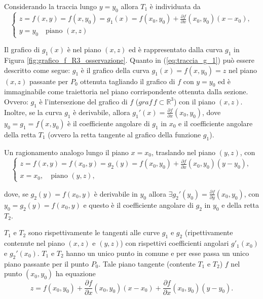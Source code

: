 Considerando la traccia lungo $y=y_0$ allora $T_1$ è individuata da
\begin{equation}\label{eq:traccia_g_1}
    \begin{cases}
        z=f(x,y)=f(x,y_0)=g_1(x) = f(x_0,y_0) + \frac{\partial f}{\partial x} (x_0,y_0) (x-x_0),\\
        y=y_0\quad \text{piano }(x,z)
    \end{cases}
\end{equation}

Il grafico di $g_1(x)$ è nel piano $(x,z)$ ed è rappresentato dalla curva $g_1$ in Figura \ref{fig:grafico_f_R3_osservazione}. Quanto in (\ref{eq:traccia_g_1}) può essere descritto come segue: $g_1$ è il grafico della curva $g_1(x)=f(x,y_0)=z$ nel piano $(x,z)$ passante per $P_0$ ottenuta tagliando il grafico di $f$ con $y=y_0$ ed è immaginabile come traiettoria nel piano corrispondente ottenuta dalla sezione. Ovvero: $g_1$ è l'intersezione del grafico di $f$ ($graf\, f\subset\mathbb R^3$) con il piano $(x,z)$. Inoltre, se la curva $g_1$ è derivabile, allora $g_1'(x)=\frac{\partial f}{\partial x}(x_0,y_0)$, dove $y_0=g_1=f(x,y_0)$ è il coefficiente angolare di $g_1$ in $x_0$ e il coefficiente angolare della retta $T_1$ (ovvero la retta tangente al grafico della funzione $g_1$).

Un ragionamento analogo lungo il piano $x=x_0$, traslando nel piano $(y,z)$, con
\begin{equation}\label{eq:traccia_g_2}
	\begin{cases}
		z=f(x,y)=f(x_0,y)=g_2(y) = f(x_0,y_0) + \frac{\partial f}{\partial x} (x_0,y_0) (y-y_0),\\
		x=x_0,\quad \text{piano } (y,z),
	\end{cases}
\end{equation}

dove, se $g_2(y)=f(x_0,y)$ è derivabile in $y_0$ allora $\exists g_2'(y_0)=\frac{\partial f}{\partial y}(x_0,y_0)$, con $y_0=g_2(y)=f(x_0,y)$ e questo è il coefficiente angolare di $g_2$ in $y_0$ e della retta $T_2$.

$T_1$ e $T_2$ sono rispettivamente le tangenti alle curve $g_1$ e $g_2$ (ripettivamente contenute nel piano $(x,z)$ e $(y,z)$) con rispettivi coefficienti angolari $g'_1(x_0)$ e $g_2'(x_0)$. $T_1$ e $T_2$ hanno un unico punto in comune e per esse passa un unico piano passante per il punto $P_0$. Tale piano tangente (contente $T_1$ e $T_2$) $f$ nel punto $(x_0,y_0)$ ha equazione
 \begin{equation}\label{eq:piano_tangente_due_variabili}
 	z=f(x_0,y_0) + \frac{\partial f}{\partial x} (x_0,y_0) (x-x_0) + \frac{\partial f}{\partial x} (x_0,y_0) (y-y_0).
 \end{equation}

